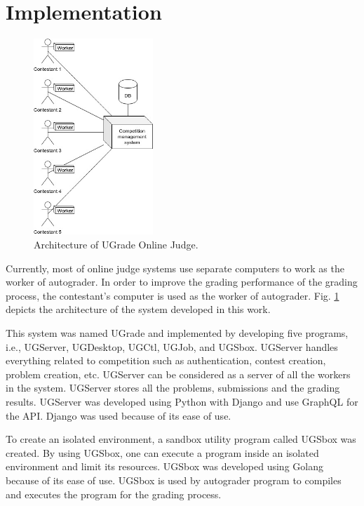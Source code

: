 \documentclass[conference,a4paper]{IEEEtran}
\begin{document}
\section{Implementation}

\begin{figure}[htbp]
\centerline{\includegraphics[width=0.4\textwidth]{images/paper-architecture-new.jpeg}}
\caption{Architecture of UGrade Online Judge.}
\label{architecture-new}
\end{figure}

Currently, most of online judge systems use separate computers to work as the worker of autograder. In order to improve the grading performance of the grading process, the contestant's computer is used as the worker of autograder. Fig. \ref{architecture-new} depicts the architecture of the system developed in this work. 

This system was named UGrade and implemented by developing five programs, i.e., UGServer, UGDesktop, UGCtl, UGJob, and UGSbox. UGServer handles everything related to competition such as authentication, contest creation, problem creation, etc. UGServer can be considered as a server of all the workers in the system. UGServer stores all the problems, submissions and the grading results. UGServer was developed using Python with Django and use GraphQL for the API. Django was used because of its ease of use.

To create an isolated environment, a sandbox utility program called UGSbox was created. By using UGSbox, one can execute a program inside an isolated environment and limit its resources. UGSbox was developed using Golang because of its ease of use. UGSbox is used by autograder program to compiles and executes the program for the grading process.
\end{document}
